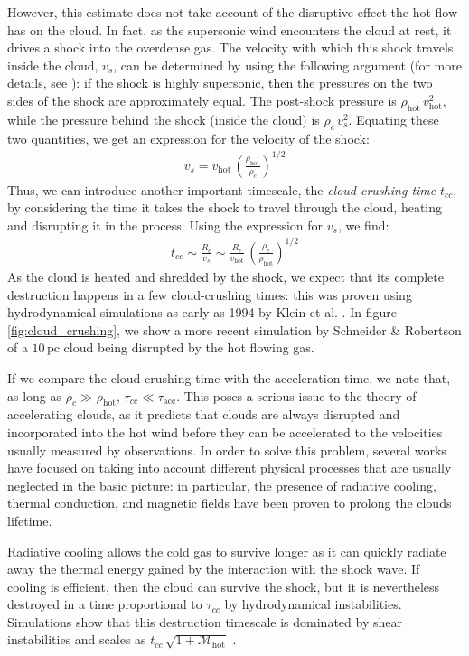 However, this estimate does not take account of the disruptive effect the hot flow has on the cloud. In fact, as the supersonic wind encounters the cloud at rest, it drives a shock into the overdense gas. The velocity with which this shock travels inside the cloud, $v_s$, can be determined by using the following argument (for more details, see \citep{klein_1994, scannapieco2015launching}): if the shock is highly supersonic, then the pressures on the two sides of the shock are approximately equal. The post-shock pressure is $\rho_\mathrm{hot}\,v_\mathrm{hot}^2$, while the pressure behind the shock (inside the cloud) is $\rho_c \,v_s^2$. Equating these two quantities, we get an expression for the velocity of the shock:
\begin{align}
    v_s = v_\mathrm{hot}\,\left(\frac{\rho_\mathrm{hot}}{\rho_c}\right)^{1/2}
\end{align}
Thus, we can introduce another important timescale, the \textit{cloud-crushing time} $t_{cc}$, by considering the time it takes the shock to travel through the cloud, heating and disrupting it in the process. Using the expression for $v_s$, we find:
\begin{align}
    t_{cc} \sim \frac{R_c}{v_s} \sim \frac{R_c}{v_\mathrm{hot}}\,\left(\frac{\rho_c}{\rho_\mathrm{hot}}\right)^{1/2}
\end{align}
As the cloud is heated and shredded by the shock, we expect that its complete destruction happens in a few cloud-crushing times: this was proven using hydrodynamical simulations as early as 1994 by Klein et al. \citep{klein_1994}. In figure \ref{fig:cloud_crushing}, we show a more recent simulation by Schneider \& Robertson \citep{schneider2017hydrodynamical} of a $10\,\mathrm{pc}$ cloud being disrupted by the hot flowing gas. 

If we compare the cloud-crushing time with the acceleration time, we note that, as long as $\rho_c\gg\rho_\mathrm{hot}$, $\tau_{cc}\ll\tau_\mathrm{acc}$. This poses a serious issue to the theory of accelerating clouds, as it predicts that clouds are always disrupted and incorporated into the hot wind before they can be accelerated to the velocities usually measured by observations. In order to solve this problem, several works have focused on taking into account different physical processes that are usually neglected in the basic picture: in particular, the presence of radiative cooling, thermal conduction, and magnetic fields have been proven to prolong the clouds lifetime. 

Radiative cooling allows the cold gas to survive longer as it can quickly radiate away the thermal energy gained by the interaction with the shock wave. If cooling is efficient, then the cloud can survive the shock, but it is nevertheless destroyed in a time proportional to $\tau_{cc}$ by hydrodynamical instabilities. Simulations show that this destruction timescale is dominated by shear instabilities and scales as $t_{cc}\,\sqrt{1+\mathcal{M}_\mathrm{hot}}$ \citep{scannapieco2015launching}. 

